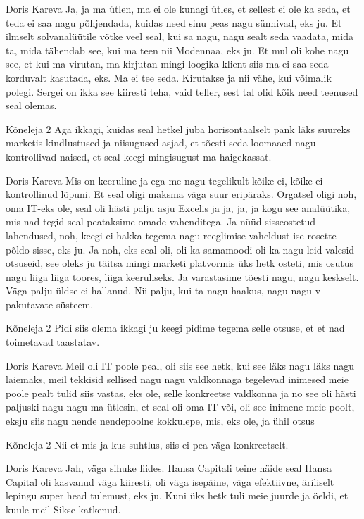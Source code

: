 Doris Kareva
Ja, ja ma ütlen, ma ei ole kunagi ütles, et sellest ei ole ka seda, et teda ei saa nagu põhjendada, kuidas need sinu peas nagu sünnivad, eks ju. Et ilmselt solvanalüütile võtke veel seal, kui sa nagu, nagu sealt seda vaadata, mida ta, mida tähendab see, kui ma teen nii Modennaa, eks ju. Et mul oli kohe nagu see, et kui ma virutan, ma kirjutan mingi loogika klient siis ma ei saa seda korduvalt kasutada, eks. Ma ei tee seda. Kirutakse ja nii vähe, kui võimalik polegi. Sergei on ikka see kiiresti teha, vaid teller, sest tal olid kõik need teenused seal olemas. 

Kõneleja 2
Aga ikkagi, kuidas seal hetkel juba horisontaalselt pank läks suureks marketis kindlustused ja niisugused asjad, et tõesti seda loomaaed nagu kontrollivad naised, et seal keegi mingisugust ma haigekassat. 

Doris Kareva
Mis on keeruline ja ega me nagu tegelikult kõike ei, kõike ei kontrollinud lõpuni. Et seal oligi maksma väga suur eripäraks. Orgatsel oligi noh, oma IT-eks ole, seal oli hästi palju asju Excelis ja ja, ja, ja kogu see analüütika, mis nad tegid seal peataksime omade vahenditega. Ja nüüd sisseostetud lahendused, noh, keegi ei hakka tegema nagu reeglimise vaheldust ise rosette põldo sisse, eks ju. Ja noh, eks seal oli, oli ka samamoodi oli ka nagu leid valesid otsuseid, see oleks ju täitsa mingi marketi platvormis üks hetk osteti, mis osutus nagu liiga liiga toores, liiga keeruliseks. Ja varastasime tõesti nagu, nagu keskselt. Väga palju üldse ei hallanud. Nii palju, kui ta nagu haakus, nagu nagu v pakutavate süsteem. 

Kõneleja 2
Pidi siis olema ikkagi ju keegi pidime tegema selle otsuse, et et nad toimetavad taastatav. 

Doris Kareva
Meil oli IT poole peal, oli siis see hetk, kui see läks nagu läks nagu laiemaks, meil tekkisid sellised nagu nagu valdkonnaga tegelevad inimesed meie poole pealt tulid siis vastas, eks ole, selle konkreetse valdkonna ja no see oli hästi paljuski nagu nagu ma ütlesin, et seal oli oma IT-või, oli see inimene meie poolt, eksju siis nagu nende nendepoolne kokkulepe, mis, eks ole, ja ühil otsus 

Kõneleja 2
Nii et mis ja kus suhtlus, siis ei pea väga konkreetselt. 

Doris Kareva
Jah, väga sihuke liides. Hansa Capitali teine näide seal Hansa Capital oli kasvanud väga kiiresti, oli väga isepäine, väga efektiivne, äriliselt lepingu super head tulemust, eks ju. Kuni üks hetk tuli meie juurde ja öeldi, et kuule meil Sikse katkenud. 

